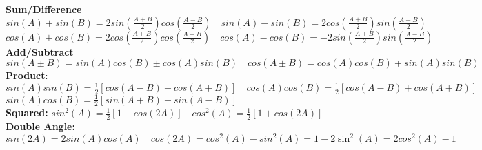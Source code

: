 \documentclass[answers,12pt,addpoints]{exam}
\begin{document}
\textbf{Sum/Difference} $sin(A) + sin(B) = 2sin(\frac{A+B}{2})cos(\frac{A-B}{2}) \quad sin(A) - sin(B) = 2cos(\frac{A+B}{2})sin(\frac{A-B}{2})$\\
$cos(A) + cos(B) = 2cos(\frac{A+B}{2})cos(\frac{A-B}{2}) \quad cos(A) - cos(B) = -2sin(\frac{A+B}{2})sin(\frac{A-B}{2})$\\
\textbf{Add/Subtract} $sin(A \pm B) = sin(A)cos(B) \pm cos(A)sin(B) \quad cos(A \pm B) = cos(A)cos(B) \mp sin(A)sin(B)$\\
\textbf{Product}: $sin(A)sin(B) = \frac{1}{2}[cos(A-B) - cos(A+B)] \quad cos(A)cos(B) = \frac{1}{2}[cos(A-B) + cos(A+B)]$\\ 
$sin(A)cos(B) = \frac{1}{2}[sin(A+B) + sin(A-B)]$\\
\textbf{Squared:} $sin^2(A) = \frac{1}{2}[1 - cos(2A)] \quad cos^2(A) = \frac{1}{2}[1 + cos(2A)]$\\
\textbf{Double Angle:} $sin(2A) = 2sin(A)cos(A) \quad cos(2A) = cos^2(A) - sin^2(A) = 1 - 2 \sin^2(A) = 2cos^2(A) -1$\\
\end{document}
